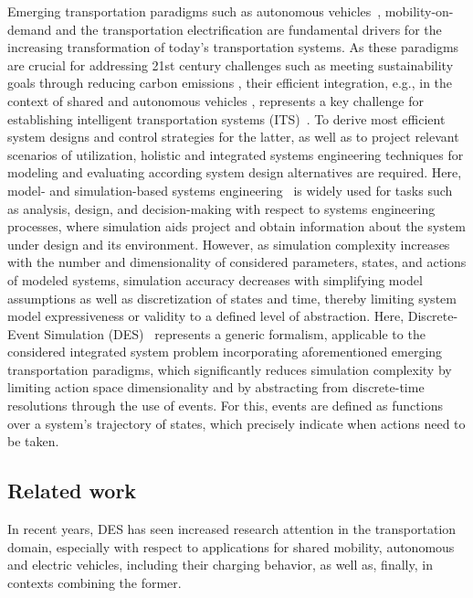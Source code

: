 \documentclass[graybox]{svmult}
\begin{document}
Emerging transportation paradigms such as autonomous vehicles~\cite{hancock2019future}, mobility-on-demand \cite{atasoy2015concept} and the transportation electrification \cite{pereirinha2018main} are fundamental drivers for the increasing transformation of today's transportation systems.
As these paradigms are crucial for addressing 21st century challenges such as meeting sustainability goals through reducing carbon emissions \cite{sachs2019six}, their efficient integration, e.g., in the context of shared and autonomous vehicles \cite{narayanan2020shared}, represents a key challenge for establishing intelligent transportation systems (ITS)~\cite{figueiredo2001towards}.
To derive most efficient system designs and control strategies for the latter, as well as to project relevant scenarios of utilization, holistic and integrated systems engineering techniques for modeling and evaluating according system design alternatives are required.
Here, model- and simulation-based systems engineering~\cite{gianni2014modeling} is widely used for tasks such as analysis, design, and decision-making with respect to systems engineering processes, where simulation aids project and obtain information about the system under design and its environment.
However, as simulation complexity increases with the number and dimensionality of considered parameters, states, and actions of modeled systems, simulation accuracy decreases with simplifying model assumptions as well as discretization of states and time, thereby limiting system model expressiveness or validity to a defined level of abstraction.
Here, Discrete-Event Simulation (DES)~\cite{fishman2001discrete} represents a generic formalism, applicable to the considered integrated system problem incorporating aforementioned emerging transportation paradigms, which significantly reduces simulation complexity by limiting action space dimensionality and by abstracting from discrete-time resolutions through the use of events.
For this, events are defined as functions over a system's trajectory of states, which precisely indicate when actions need to be taken. 

\subsection{Related work}

In recent years, DES has seen increased research attention in the transportation domain, especially with respect to applications for shared mobility, autonomous and electric vehicles, including their charging behavior, as well as, finally, in contexts combining the former.
\end{document}
